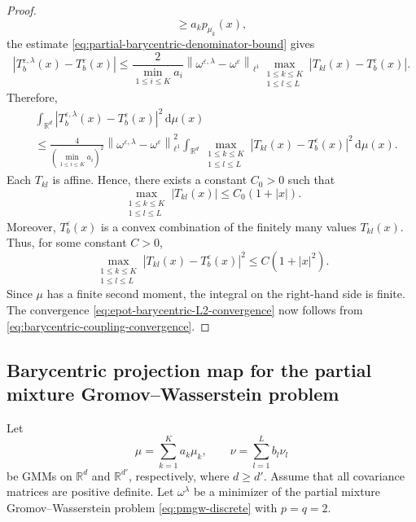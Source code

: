 \documentclass[a4paper,11pt]{article}
\numberwithin{equation}{section}
\newcommand{\eps}{\varepsilon}
\newcommand{\RR}{\mathbb{R}}
\newcommand{\dd}{\,\mathrm{d}}
\begin{document}
\begin{proof}
\begin{equation*}
  \geq
  a_kp_{\mu_k}(x),
\end{equation*}
the estimate \eqref{eq:partial-barycentric-denominator-bound} gives
\begin{equation*}
  \left|T_b^{\eps,\lambda}(x)-T_b^\eps(x)\right|\leq \frac{2}{\displaystyle\min_{1\leq i\leq K}a_i}\left\|\omega^{\eps,\lambda}-\omega^\eps\right\|_{\ell^1}\max_{\substack{1\leq k\leq K\\1\leq l\leq L}}\left|T_{kl}(x)-T_b^\eps(x)\right|.
\end{equation*}
Therefore,
\begin{align*}
  &\int_{\RR^d}\left|T_b^{\eps,\lambda}(x)-T_b^\eps(x)\right|^2\dd\mu(x) \\
  &\leq \frac{4}{\left(\displaystyle\min_{1\leq i\leq K}a_i\right)^2}\left\|\omega^{\eps,\lambda}-\omega^\eps\right\|_{\ell^1}^2\int_{\RR^d}\max_{\substack{1\leq k\leq K\\1\leq l\leq L}}\left|T_{kl}(x)-T_b^\eps(x)\right|^2\dd\mu(x).
\end{align*}
Each $T_{kl}$ is affine. Hence, there exists a constant $C_0>0$ such that
\begin{equation*}
  \max_{\substack{1\leq k\leq K\\1\leq l\leq L}}
  |T_{kl}(x)| \leq C_0(1+|x|).
\end{equation*}
Moreover, $T_b^\eps(x)$ is a convex combination of the finitely many values $T_{kl}(x)$. Thus, for some constant $C>0$,
\begin{equation*}
  \max_{\substack{1\leq k\leq K\\1\leq l\leq L}} \left|T_{kl}(x)-T_b^\eps(x)\right|^2 \leq C(1+|x|^2).
\end{equation*}
Since $\mu$ has a finite second moment, the integral on the right-hand side is finite. The convergence \eqref{eq:epot-barycentric-L2-convergence} now follows from \eqref{eq:barycentric-coupling-convergence}.
\end{proof}


\subsection{Barycentric projection map for the partial mixture Gromov--Wasserstein problem}\label{subsec:pmgw-barycentric}
Let
\begin{equation*}
  \mu=\sum_{k=1}^{K}a_k\mu_k,\qquad
  \nu=\sum_{l=1}^{L}b_l\nu_l
\end{equation*}
be GMMs on $\RR^d$ and $\RR^{d'}$, respectively, where $d\geq d'$. Assume that all covariance matrices are positive definite. Let $\omega^\lambda$ be a minimizer of the partial mixture Gromov--Wasserstein problem \eqref{eq:pmgw-discrete} with $p=q=2$.
\end{document}
